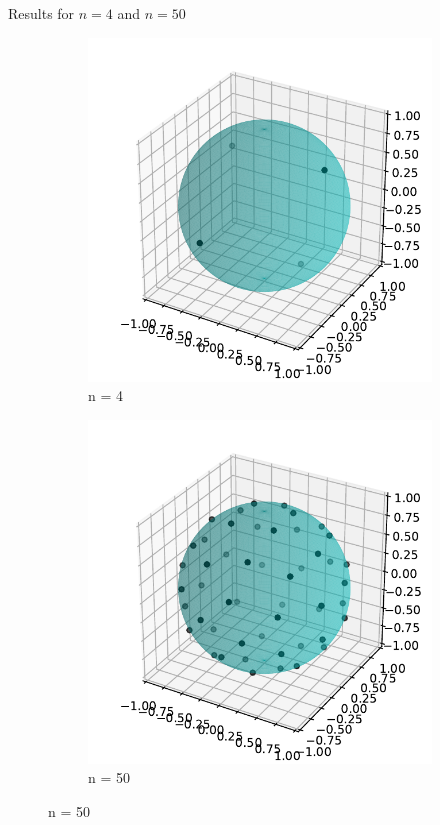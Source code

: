 \documentclass{beamer}
\begin{document}
\begin{frame}{Results for $n=4$ and $n=50$}
\begin{figure}[!ht]
	\centering
	\begin{subfigure}{.5\textwidth}
		\centering
		\includegraphics[scale=0.6]{used_images/generated2.pdf}
		\caption{n = 4}
	\end{subfigure}%
	\begin{subfigure}{.5\textwidth}
		\centering
		\includegraphics[scale=0.6]{used_images/generated1.pdf}
		\caption{n = 50}
	\end{subfigure}%

\end{figure}
\end{frame}
\end{document}
